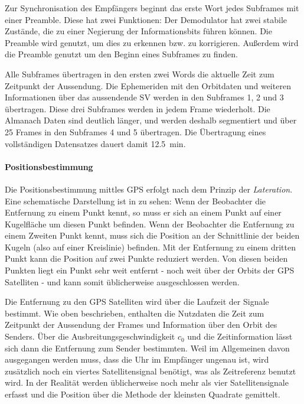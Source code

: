 
Zur Synchronisation des Empfängers beginnt das erste Wort jedes Subframes mit einer Preamble. Diese hat zwei Funktionen: Der Demodulator hat zwei stabile Zustände, die zu einer Negierung der Informationsbits führen können. Die Preamble wird genutzt, um dies zu erkennen bzw. zu korrigieren. Außerdem wird die Preamble genutzt um den Beginn eines Subframes zu finden.

Alle Subframes übertragen in den ersten zwei Words die aktuelle Zeit zum Zeitpunkt der Aussendung. Die Ephemeriden mit den Orbitdaten und weiteren Informationen über das aussendende \gls{SV} werden in den Subframes 1, 2 und 3 übertragen. Diese drei Subframes werden in jedem Frame wiederholt. Die Almanach Daten sind deutlich länger, und werden deshalb segmentiert und über 25 Frames in den Subframes 4 und 5 übertragen. Die Übertragung eines vollständigen Datensatzes dauert damit \SI{12.5}{\minute}.


\paragraph{Positionsbestimmung}
\label{positionsbestimmung}
Die Positionsbestimmung mittles GPS erfolgt nach dem Prinzip der \emph{Lateration}. Eine schematische Darstellung ist in  zu sehen: Wenn der Beobachter die Entfernung zu einem Punkt kennt, so muss er sich an einem Punkt auf einer Kugelfläche um diesen Punkt befinden. Wenn der Beobachter die Entfernung zu einem Zweiten Punkt kennt, muss sich die Position an der Schnittlinie der beiden Kugeln (also auf einer Kreislinie) befinden. Mit der Entfernung zu einem dritten Punkt kann die Position auf zwei Punkte reduziert werden. Von diesen beiden Punkten liegt ein Punkt sehr weit entfernt - noch weit über der Orbits der GPS Satelliten - und kann somit üblicherweise ausgeschlossen werden. 

Die Entfernung zu den GPS Satelliten wird über die Laufzeit der Signale bestimmt. Wie oben beschrieben, enthalten die Nutzdaten die Zeit zum Zeitpunkt der Aussendung der Frames und Information über den Orbit des Senders. Über die Ausbreitungsgeschwindigkeit $c_0$ und die Zeitinformation lässt sich dann die Entfernung zum Sender bestimmten. Weil im Allgemeinen davon ausgegangen werden muss, dass die Uhr im Empfänger ungenau ist, wird zusätzlich noch ein viertes Satellitensignal benötigt, was als Zeitreferenz benutzt wird. In der Realität werden üblicherweise noch mehr als vier Satellitensignale erfasst und die Position über die Methode der kleinsten Quadrate gemittelt.

